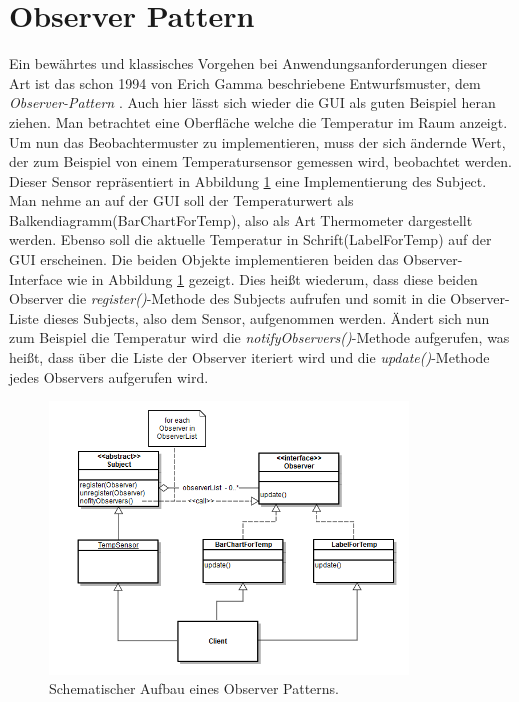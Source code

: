 \section{Observer Pattern}
Ein bewährtes und klassisches Vorgehen bei Anwendungsanforderungen dieser Art ist das schon 1994 von Erich Gamma beschriebene Entwurfsmuster, dem \textit{Observer-Pattern} \cite{Gamma.2011}. Auch hier lässt sich wieder die GUI als guten Beispiel heran ziehen. Man betrachtet eine Oberfläche welche die Temperatur im Raum anzeigt. Um nun das Beobachtermuster zu implementieren, muss der sich ändernde Wert, der zum Beispiel von einem Temperatursensor gemessen wird, beobachtet werden. Dieser Sensor repräsentiert in Abbildung \ref{pic:observerpattern} eine Implementierung des Subject. Man nehme an auf der GUI soll der Temperaturwert als Balkendiagramm(BarChartForTemp), also als Art Thermometer dargestellt werden. Ebenso soll die aktuelle Temperatur in Schrift(LabelForTemp) auf der GUI erscheinen. Die beiden Objekte implementieren beiden das Observer-Interface wie in Abbildung \ref{pic:observerpattern} gezeigt. Dies heißt wiederum, dass diese beiden Observer die \textit{register()}-Methode des Subjects aufrufen und somit in die Observer-Liste dieses Subjects, also dem Sensor, aufgenommen werden. Ändert sich nun zum Beispiel die Temperatur wird die \textit{notifyObservers()}-Methode aufgerufen, was heißt, dass über die Liste der Observer iteriert wird und die \textit{update()}-Methode jedes Observers aufgerufen wird.
\begin{figure}
	\centering
	\includegraphics[width=0.85\textwidth]{Abb/observerpattern_self}
	\caption{Schematischer Aufbau eines Observer Patterns.}
	\label{pic:observerpattern}
\end{figure}
